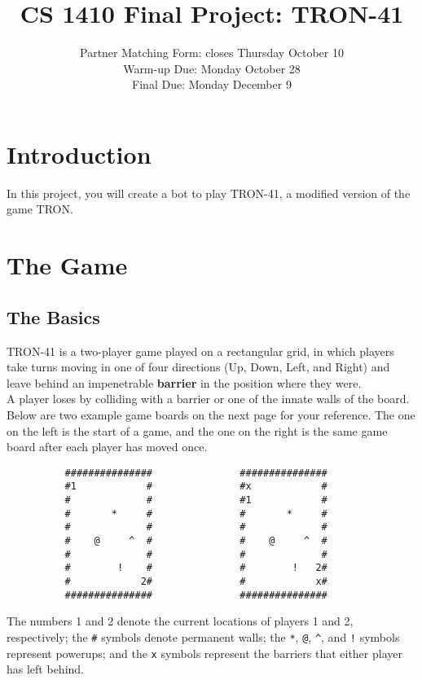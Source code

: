 \documentclass{article}
\title{CS 1410 Final Project: TRON-41}
\date{Partner Matching Form: closes Thursday October 10\\Warm-up Due: Monday October 28\\Final Due: Monday December 9}
\begin{document}
\maketitle

\section{Introduction}
   In this project, you will create a bot to play TRON-41, a modified version of the game TRON.

\section{The Game}
    \subsection{The Basics}
    TRON-41 is a two-player game played on a rectangular grid, in which players take turns moving in one of four directions (Up, Down, Left, and Right) and leave behind an impenetrable \textbf{barrier} in the position where they were. ~\\

    A player loses by colliding with a barrier or one of the innate walls of the board.
    Below are two example game boards on the next page for your reference.
    The one on the left is the start of a game, and the one on the right is the same game board after each player has moved once. ~\\

    \begin{centering}
    \begin{verbatim}
          ###############               ###############
          #1            #               #x            #
          #             #               #1            #
          #       *     #               #       *     #
          #             #               #             #
          #    @     ^  #               #    @     ^  #
          #             #               #             #
          #        !    #               #        !   2#
          #            2#               #            x#
          ###############               ###############
    \end{verbatim}
    \end{centering}

    The numbers 1 and 2 denote the current locations of players 1 and 2, respectively; the \verb|#| symbols denote permanent walls; the \verb|*|, \verb|@|, \verb|^|, and \verb|!| symbols represent powerups; and the \verb|x| symbols represent the barriers that either player has left behind.
\end{document}
